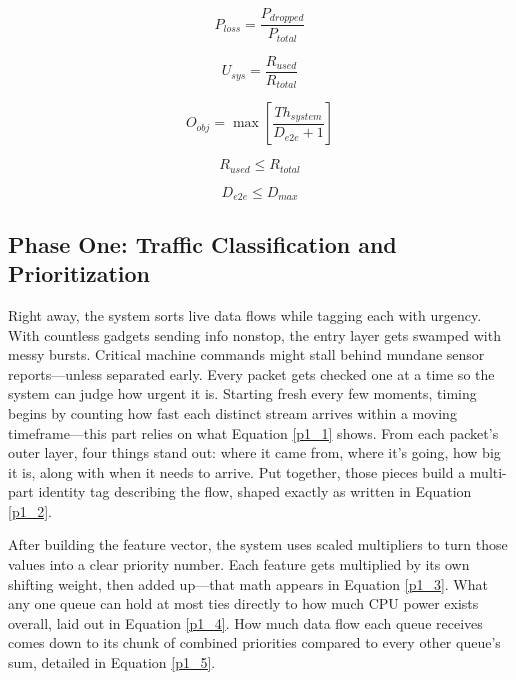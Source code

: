 \documentclass[a4paper,fleqn]{cas-dc}
\numberwithin{equation}{section}
\begin{document}
\begin{equation}
P_{loss} = \frac{P_{dropped}}{P_{total}}
\label{eq_packet_loss_prob}
\end{equation}

\begin{equation}
U_{sys} = \frac{R_{used}}{R_{total}}
\label{eq_resource_utilization}
\end{equation}

\begin{equation}
O_{obj} = \max \left[ \frac{Th_{system}}{D_{e2e} + 1} \right]
\label{eq_objective_function}
\end{equation}

\begin{equation}
R_{used} \leq R_{total}
\label{eq_capacity_constraint}
\end{equation}

\begin{equation}
D_{e2e} \leq D_{max}
\label{eq_delay_constraint}
\end{equation}

\subsection{Phase One: Traffic Classification and Prioritization}

Right away, the system sorts live data flows while tagging each with urgency. With countless gadgets sending info nonstop, the entry layer gets swamped with messy bursts. Critical machine commands might stall behind mundane sensor reports—unless separated early. Every packet gets checked one at a time so the system can judge how urgent it is. Starting fresh every few moments, timing begins by counting how fast each distinct stream arrives within a moving timeframe—this part relies on what Equation \ref{p1_1} shows. From each packet's outer layer, four things stand out: where it came from, where it's going, how big it is, along with when it needs to arrive. Put together, those pieces build a multi-part identity tag describing the flow, shaped exactly as written in Equation \ref{p1_2}.

After building the feature vector, the system uses scaled multipliers to turn those values into a clear priority number. Each feature gets multiplied by its own shifting weight, then added up—that math appears in Equation \ref{p1_3}. What any one queue can hold at most ties directly to how much CPU power exists overall, laid out in Equation \ref{p1_4}. How much data flow each queue receives comes down to its chunk of combined priorities compared to every other queue's sum, detailed in Equation \ref{p1_5}.
\end{document}
